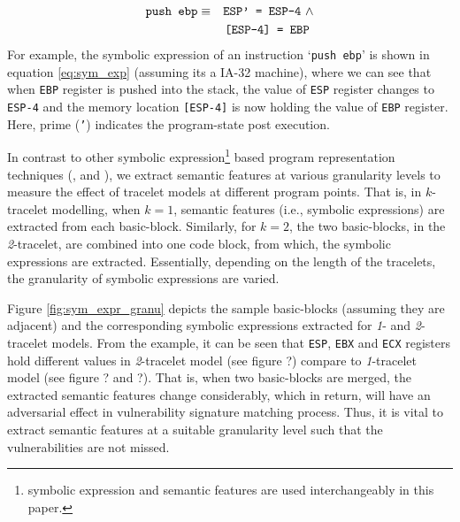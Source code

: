 \begin{eqnarray}
\label{eq:sym_exp}
 \text{\texttt{push ebp}} &\equiv& \text{\texttt{ESP' = ESP-4}} ~\wedge \nonumber \\
   &&  \text{\texttt{[ESP-4] = EBP}}~
\end{eqnarray}
For example, the symbolic expression of an instruction `\texttt{push ebp}' is shown in equation \ref{eq:sym_exp} (assuming its a IA-32 machine), where we can see that when \texttt{EBP} register is pushed into the stack, the value of \texttt{ESP} register changes to \texttt{ESP-4} and the memory location \texttt{[ESP-4]} is now holding the value of \texttt{EBP} register. Here, prime (\texttt{'}) indicates the program-state post execution.  

In contrast to other symbolic expression\footnote{symbolic expression and semantic features are used interchangeably in this paper.} based program representation techniques (\cite{pewnycross}, \cite{lakhotia2013fast} and \cite{ruttenberg2014identifying}), we extract semantic features at various granularity levels to measure the effect of tracelet models at different program points. That is, in $k$-tracelet modelling, when $k=1$, semantic features (i.e., symbolic expressions) are extracted from each basic-block. Similarly, for $k=2$, the two basic-blocks, in the \textit{2}-tracelet, are combined into one code block, from which, the symbolic expressions are extracted. Essentially, depending on the length of the tracelets, the granularity of symbolic expressions are varied. 

Figure \ref{fig:sym_expr_granu} depicts the sample basic-blocks (assuming they are adjacent) and the corresponding symbolic expressions extracted for \textit{1}- and \textit{2}-tracelet models. From the example, it can be seen that \texttt{ESP}, \texttt{EBX} and \texttt{ECX} registers hold different values in \textit{2}-tracelet model (see figure ?) compare to \textit{1}-tracelet model (see figure ? and ?). That is, when two basic-blocks are merged, the extracted semantic features change considerably, which in return, will have an adversarial effect in vulnerability signature matching process. Thus, it is vital to extract semantic features at a suitable granularity level such that the vulnerabilities are not missed. 

